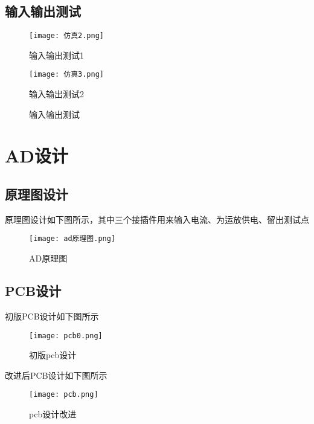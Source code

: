 \documentclass{zjureport}
\begin{document}
\newpage
\subsection{输入输出测试}
\begin{figure}[h]
  \begin{minipage}{0.45\linewidth}
    \centering
    \texttt{[image: 仿真2.png]}
    \caption{输入输出测试1}
  \end{minipage}
  \begin{minipage}{0.45\linewidth}
    \centering
    \texttt{[image: 仿真3.png]}
    \caption{输入输出测试2}
  \end{minipage}
  \caption{输入输出测试}
\end{figure}

\section{AD设计}
\subsection{原理图设计}
原理图设计如下图所示，其中三个接插件用来输入电流、为运放供电、留出测试点
\begin{figure}[H]
  \begin{center}
  \texttt{[image: ad原理图.png]}
  \end{center}
  \caption{AD原理图}
\end{figure}

\subsection{PCB设计}
初版PCB设计如下图所示
\begin{figure}[H]
  \begin{center}
  \texttt{[image: pcb0.png]}
  \end{center}
  \caption{初版pcb设计}
\end{figure}

改进后PCB设计如下图所示
\begin{figure}[H]
  \begin{center}
  \texttt{[image: pcb.png]}
  \end{center}
  \caption{pcb设计改进}
\end{figure}
\end{document}
